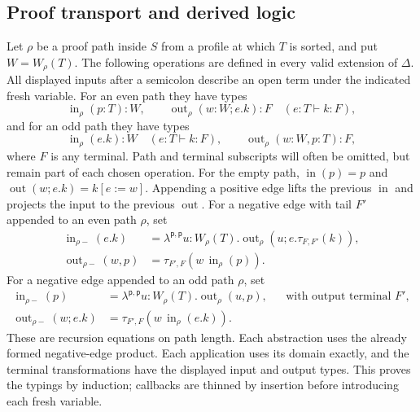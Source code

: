 \subsection{Proof transport and derived logic}
\label{subsec:enc-proof-transport}

Let $\rho$ be a proof path inside $S$ from a profile at which $T$ is sorted, and put
$W=W_\rho(T)$.  The following operations are defined in every valid
extension of $\Delta$.  All displayed inputs after a semicolon describe
an open term under the indicated fresh variable.
For an even path they have types
\[
  \operatorname{in}_\rho(p:T):W,
  \qquad \operatorname{out}_\rho(w:W;e.k):F
       \quad(e:T\vdash k:F),
\]
and for an odd path they have types
\[
  \operatorname{in}_\rho(e.k):W
       \quad(e:T\vdash k:F),
  \qquad \operatorname{out}_\rho(w:W,p:T):F,
\]
where $F$ is any terminal.  Path and terminal subscripts will often be
omitted, but remain part of each chosen operation.
For the empty path, $\operatorname{in}(p)=p$ and
$\operatorname{out}(w;e.k)=k[e:=w]$.
Appending a positive edge lifts the previous $\operatorname{in}$ and
projects the input to the previous $\operatorname{out}$.
For a negative edge with tail $F'$ appended to an even path $\rho$, set
\begin{align*}
 \operatorname{in}_{\rho-}(e.k)
    &=\lambda^{\mathsf p,\mathsf p}u:W_\rho(T).
        \operatorname{out}_\rho(u;e.\tau_{F,F'}(k)),\\
 \operatorname{out}_{\rho-}(w,p)
    &=\tau_{F',F}(w\,\operatorname{in}_\rho(p)).
\end{align*}
For a negative edge appended to an odd path $\rho$, set
\begin{align*}
 \operatorname{in}_{\rho-}(p)
    &=\lambda^{\mathsf p,\mathsf p}u:W_\rho(T).
        \operatorname{out}_\rho(u,p),
       &&\text{with output terminal }F',\\
 \operatorname{out}_{\rho-}(w;e.k)
    &=\tau_{F',F}(w\,\operatorname{in}_\rho(e.k)).
\end{align*}
These are recursion equations on path length.  Each abstraction uses the
already formed negative-edge product.  Each application uses its domain
exactly, and the terminal transformations have the displayed input and
output types.  This proves the typings by induction; callbacks are thinned
by insertion before introducing each fresh variable.

